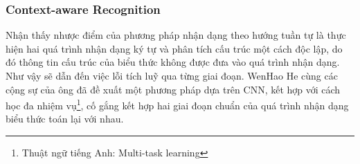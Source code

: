 \documentclass[a4paper]{article}
\theoremstyle{definition}
\begin{document}
	
	\subsubsection{Context-aware Recognition\cite{context}}
	\label{subsec: context}
	Nhận thấy nhược điểm của phương pháp nhận dạng theo hướng tuần tự là thực hiện hai quá trình nhận dạng ký tự và phân tích cấu trúc một cách độc lập, do đó thông tin cấu trúc của biểu thức không được đưa vào quá trình nhận dạng. Như vậy sẽ dẫn đến việc lỗi tích luỹ qua từng giai đoạn\cite{context}.
	WenHao He cùng các cộng sự của ông đã đề xuất một phương pháp dựa trên CNN, kết hợp với cách học đa nhiệm vụ\footnote{Thuật ngữ tiếng Anh: Multi-task learning}, cố gắng kết hợp hai giai đoạn chuẩn của quá trình nhận dạng biểu thức toán lại với nhau.
	
\end{document}
